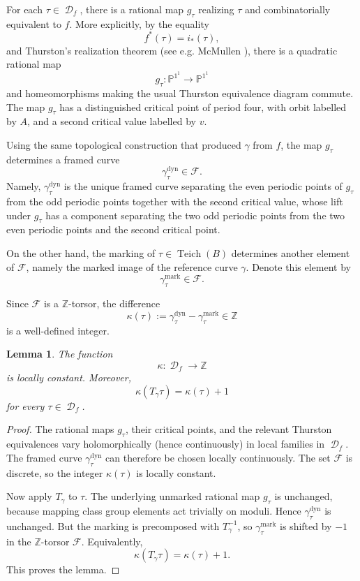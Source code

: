 \documentclass[11pt]{article}
\theoremstyle{plain}
\newtheorem{lemma}[theorem]{Lemma}
\theoremstyle{definition}
\DeclareMathOperator{\Teich}{Teich}
\DeclareMathOperator{\D}{\mathcal D}
\newcommand{\PP}{\mathbb P^1}
\begin{document}
For each \(\tau\in\D_f\), there is a rational map \(g_\tau\) realizing \(\tau\) and combinatorially equivalent to \(f\). More explicitly, by the equality
\[
f^*(\tau)=i_*(\tau),
\]
and Thurston's realization theorem (see e.g. McMullen \cite{McM}), there is a quadratic rational map
\[
g_\tau:\PP^1\longrightarrow\PP^1
\]
and homeomorphisms making the usual Thurston equivalence diagram commute. The map \(g_\tau\) has a distinguished critical point of period four, with orbit labelled by \(A\), and a second critical value labelled by \(v\).

Using the same topological construction that produced \(\gamma\) from \(f\), the map \(g_\tau\) determines a framed curve
\[
\gamma_\tau^{\mathrm{dyn}}\in\mathcal F.
\]
Namely, \(\gamma_\tau^{\mathrm{dyn}}\) is the unique framed curve separating the even periodic points of \(g_\tau\) from the odd periodic points together with the second critical value, whose lift under \(g_\tau\) has a component separating the two odd periodic points from the two even periodic points and the second critical point.

On the other hand, the marking of \(\tau\in\Teich(B)\) determines another element of \(\mathcal F\), namely the marked image of the reference curve \(\gamma\). Denote this element by
\[
\gamma_\tau^{\mathrm{mark}}\in\mathcal F.
\]

Since \(\mathcal F\) is a \(\mathbb Z\)-torsor, the difference
\[
\kappa(\tau):=\gamma_\tau^{\mathrm{dyn}}-\gamma_\tau^{\mathrm{mark}}\in\mathbb Z
\]
is a well-defined integer.

\begin{lemma}\label{lem:kappa}
The function
\[
\kappa:\D_f\longrightarrow\mathbb Z
\]
is locally constant. Moreover,
\[
\kappa(T_\gamma\tau)=\kappa(\tau)+1
\]
for every \(\tau\in\D_f\).
\end{lemma}

\begin{proof}
The rational maps \(g_\tau\), their critical points, and the relevant Thurston equivalences vary holomorphically (hence continuously) in local families in \(\D_f\). The framed curve \(\gamma_\tau^{\mathrm{dyn}}\) can therefore be chosen locally continuously. The set \(\mathcal F\) is discrete, so the integer \(\kappa(\tau)\) is locally constant.

Now apply \(T_\gamma\) to \(\tau\). The underlying unmarked rational map \(g_\tau\) is unchanged, because mapping class group elements act trivially on moduli. Hence \(\gamma_\tau^{\mathrm{dyn}}\) is unchanged. But the marking is precomposed with \(T_\gamma^{-1}\), so \(\gamma_\tau^{\mathrm{mark}}\) is shifted by \(-1\) in the \(\mathbb Z\)-torsor \(\mathcal F\). Equivalently,
\[
\kappa(T_\gamma\tau)=\kappa(\tau)+1.
\]
This proves the lemma.
\end{proof}
\end{document}

